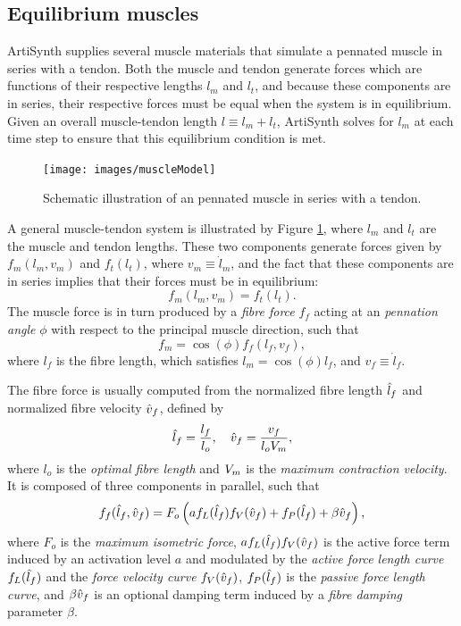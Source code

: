 \subsection{Equilibrium muscles}
\label{equilibriumMuscles:sec}

ArtiSynth supplies several muscle materials that simulate a pennated
muscle in series with a tendon. Both the muscle and tendon generate
forces which are functions of their respective lengths $l_m$ and
$l_t$, and because these components are in series, their respective
forces must be equal when the system is in equilibrium. Given an
overall muscle-tendon length $l \equiv l_m + l_t$, ArtiSynth solves
for $l_m$ at each time step to ensure that this equilibrium condition
is met.

\begin{figure}[h]
\begin{center}
 \texttt{[image: images/muscleModel]}
\end{center}
\caption{Schematic illustration of an pennated muscle in series with a
tendon.}
\label{equilibriumMuscles:fig}
\end{figure}

A general muscle-tendon system is illustrated by Figure
\ref{equilibriumMuscles:fig}, where $l_m$ and $l_t$ are the muscle and
tendon lengths.  These two components generate forces given by
$f_m(l_m, v_m)$ and $f_t(l_t)$, where $v_m \equiv \dot l_m$, and the
fact that these components are in series implies that their forces
must be in equilibrium:
%
\begin{equation}
f_m(l_m, v_m) = f_t(l_t).
\label{equilibrium:eqn}
\end{equation}
%
The muscle force is in turn produced by a {\it fibre force} $f_f$
acting at an {\it pennation angle} $\phi$ with respect to the
principal muscle direction, such that
%
 \begin{equation*}
f_m = \cos(\phi) f_f (l_f, v_f),
\end{equation*}
%
where $l_f$ is the fibre length, which satisfies
$l_m = \cos(\phi) l_f$, and $v_f \equiv \dot l_f$.

The fibre force is usually computed from the normalized fibre length
$\hat{l}_f$ and normalized fibre velocity $\hat{v}_f$, defined by
%
\begin{equation}
\hat{l}_f = \frac{l_f}{l_o}, \quad \hat{v}_f = \frac{v_f}{l_o V_{m}},
\label{lfn:eqn}
\end{equation}
%
where $l_o$ is the {\it optimal fibre length} and $V_{m}$ is the {\it maximum
contraction velocity}. It is composed of three components in parallel,
such that
%
\begin{equation}
f_f (\hat{l}_f, \hat{v}_f) = F_o \left( a f_L(\hat{l}_f) f_V(\hat{v}_f) + f_P(\hat{l}_f) +
\beta \hat{v}_f \right),
\label{ff:eqn}
\end{equation}
%
where $F_o$ is the {\it maximum isometric force},
$a f_L(\hat{l}_f) f_V(\hat{v}_f)$ is the active force term induced by an
activation level $a$ and modulated by the {\it active force length
curve} $f_L(\hat{l}_f)$ and the {\it force velocity curve} $f_V(\hat{v}_f)$,
$f_P(\hat{l}_f)$ is the {\it passive force length curve}, and $\beta \hat{v}_f$
is an optional damping term induced by a {\it fibre damping} parameter
$\beta$.

